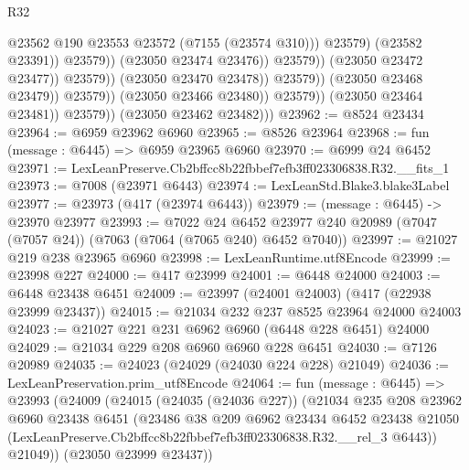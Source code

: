 \begin{lexlean}{R32}
\begin{coremodule}
                                                      @23562
                                                      @190
                                                      @23553
                                                      @23572
                                                      (@7155 (@23574 @310)))
                                                    @23579)
                                                  (@23582 @23391))
                                                @23579))
                                            (@23050 @23474 @23476))
                                          @23579))
                                      (@23050 @23472 @23477))
                                    @23579))
                                (@23050 @23470 @23478))
                              @23579))
                          (@23050 @23468 @23479))
                        @23579))
                    (@23050 @23466 @23480))
                  @23579))
              (@23050 @23464 @23481))
            @23579))
        (@23050 @23462 @23482)))
@23962 := @8524 @23434
@23964 := @6959 @23962 @6960
@23965 := @8526 @23964
@23968 := fun (message : @6445) => @6959 @23965 @6960
@23970 := @6999 @24 @6452
@23971 := LexLeanPreserve.Cb2bffcc8b22fbbef7efb3ff023306838.R32.__fits_1
@23973 := @7008 (@23971 @6443)
@23974 := LexLeanStd.Blake3.blake3Label
@23977 := @23973 (@417 (@23974 @6443))
@23979 := (message : @6445) -> @23970 @23977
@23993 := @7022
    @24
    @6452
    @23977
    @240
    @20989
    (@7047 (@7057 @24))
    (@7063 (@7064 (@7065 @240) @6452 @7040))
@23997 := @21027 @219 @238 @23965 @6960
@23998 := LexLeanRuntime.utf8Encode
@23999 := @23998 @227
@24000 := @417 @23999
@24001 := @6448 @24000
@24003 := @6448 @23438 @6451
@24009 := @23997 (@24001 @24003) (@417 (@22938 @23999 @23437))
@24015 := @21034 @232 @237 @8525 @23964 @24000 @24003
@24023 := @21027 @221 @231 @6962 @6960 (@6448 @228 @6451) @24000
@24029 := @21034 @229 @208 @6960 @6960 @228 @6451
@24030 := @7126 @20989
@24035 := @24023 (@24029 (@24030 @224 @228) @21049)
@24036 := LexLeanPreservation.prim_utf8Encode
@24064 := fun (message : @6445) =>
  @23993
    (@24009
      (@24015
        (@24035 (@24036 @227))
        (@21034
          @235
          @208
          @23962
          @6960
          @23438
          @6451
          (@23486
            @38
            @209
            @6962
            @23434
            @6452
            @23438
            @21050
            (LexLeanPreserve.Cb2bffcc8b22fbbef7efb3ff023306838.R32.__rel_3 @6443))
          @21049))
      (@23050 @23999 @23437))

\end{coremodule}
\end{lexlean}
